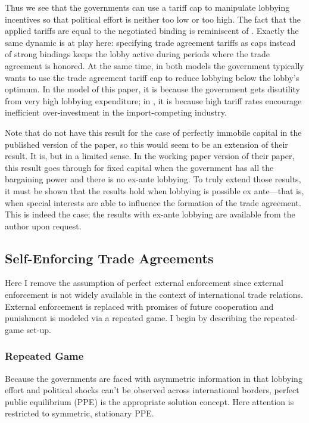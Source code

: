 \documentclass[12pt]{article}
\begin{document}
Thus we see that the governments can use a tariff cap to manipulate lobbying incentives so that political effort is neither too low or too high. The fact that the applied tariffs are equal to the negotiated binding is reminiscent of \Textcite{mrc2007}. Exactly the same dynamic is at play here: specifying trade agreement tariffs as caps instead of strong bindings keeps the lobby active during periods where the trade agreement is honored. At the same time, in both models the government typically wants to use the trade agreement tariff cap to reduce lobbying below the lobby's optimum. In the model of this paper, it is because the government gets disutility from very high lobbying expenditure; in \Textcite{mrc2007}, it is because high tariff rates encourage inefficient over-investment in the import-competing industry.

Note that \Textcite{mrc2007} do not have this result for the case of perfectly immobile capital in the published version of the paper, so this would seem to be an extension of their result. It is, but in a limited sense. In the working paper version of their paper, this result goes through for fixed capital when the government has all the bargaining power and there is no ex-ante lobbying. To truly extend those results, it must be shown that the results hold when lobbying is possible ex ante---that is, when special interests
 are able to influence the formation of the trade agreement. This is indeed the case; the results with ex-ante lobbying are available from the author upon request.

					
	
\subsection{Self-Enforcing Trade Agreements}
\label{sec:self}
Here I remove the assumption of perfect external enforcement since external enforcement is not widely available in the context of international trade relations. External enforcement is replaced with promises of future cooperation and punishment is modeled via a repeated game. I begin by describing the repeated-game set-up. 

\subsubsection{Repeated Game}
Because the governments are faced with asymmetric information in that lobbying effort and political shocks can't be observed across international borders, perfect public equilibrium (PPE) is the appropriate solution concept. Here attention is restricted to symmetric, stationary PPE.
	
\end{document}
